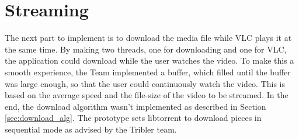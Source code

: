 \section{Streaming}
\thispagestyle{fancy}
The next part to implement is to download the media file while VLC plays it at the same time. By making two threads, one for downloading and one for VLC, the application could download while the user watches the video. To make this a smooth experience, the Team implemented a buffer, which filled until the buffer was large enough, so that the user could continuously watch the video. This is based on the average speed and the file-size of the video to be streamed. In the end, the download algorithm wasn't implemented as described in Section \ref{sec:download_alg}. The prototype sets libtorrent to download pieces in sequential mode as advised by the Tribler team. 